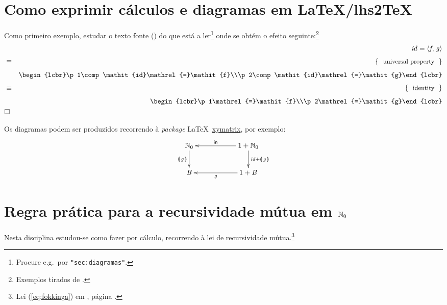 \documentclass[11pt, a4paper, fleqn]{article}
\newcommand{\Conid}[1]{\mathit{#1}}
\newcommand{\Varid}[1]{\mathit{#1}}
\begin{document}
\section{Como exprimir cálculos e diagramas em LaTeX/lhs2TeX} \label{sec:diagramas}

Como primeiro exemplo, estudar o texto fonte () do que está a ler\footnote{
Procure e.g.\ por \texttt{"sec:diagramas"}.} onde se obtém o efeito seguinte:\footnote{Exemplos
tirados de \cite{Ol18}.}
\begin{eqnarray*}
\start
     \ensuremath{\Varid{id}\mathrel{=}\conj{\Varid{f}}{\Varid{g}}}
%
\just\equiv{ universal property }
%
        \ensuremath{\begin{lcbr}\p1\comp \Varid{id}\mathrel{=}\Varid{f}\\\p2\comp \Varid{id}\mathrel{=}\Varid{g}\end{lcbr}}
%
\just\equiv{ identity }
%
        \ensuremath{\begin{lcbr}\p1\mathrel{=}\Varid{f}\\\p2\mathrel{=}\Varid{g}\end{lcbr}}
\qed
\end{eqnarray*}

Os diagramas podem ser produzidos recorrendo à \emph{package} \LaTeX\
\href{https://ctan.org/pkg/xymatrix}{xymatrix}, por exemplo:
\begin{eqnarray*}
\xymatrix@C=2cm{
    \ensuremath{\N_0}
           \ar[d]_-{\ensuremath{\llparenthesis\, \Varid{g}\,\rrparenthesis}}
&
    \ensuremath{\mathrm{1}\mathbin{+}\N_0}
           \ar[d]^{\ensuremath{\Varid{id}\mathbin{+}\llparenthesis\, \Varid{g}\,\rrparenthesis}}
           \ar[l]_-{\ensuremath{\mathsf{in}}}
\\
     \ensuremath{\Conid{B}}
&
     \ensuremath{\mathrm{1}\mathbin{+}\Conid{B}}
           \ar[l]^-{\ensuremath{\Varid{g}}}
}
\end{eqnarray*}

\section{Regra prática para a recursividade mútua em \ensuremath{\N_0}}\label{sec:mr}

Nesta disciplina estudou-se como fazer  por cálculo,
recorrendo à lei de recursividade mútua.\footnote{Lei (\ref{eq:fokkinga})
em \cite{Ol18}, página \pageref{eq:fokkinga}.}
\end{document}

